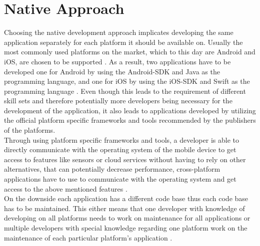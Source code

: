 \documentclass[Bachelor,BIF,english]{twbook}
\begin{document}
\section{Native Approach}
Choosing the native development approach implicates developing the same application separately for each platform it should be available on. Usually the most commonly used platforms on the market, which to this day are Android and iOS, are chosen to be supported \cite[p.~5]{Steczko2016}. As a result, two applications have to be developed one for Android by using the Android-SDK and Java as the programming language, and one for iOS by using the iOS-SDK and Swift as the programming language \cite[p.~5]{LinckArne2016} \cite{AppleGettingStarted}. Even though this leads to the requirement of different skill sets and therefore potentially more developers being necessary for the development of the application, it also leads to applications developed by utilizing the official platform specific frameworks and tools recommended by the publishers of the platforms. 
\\[\baselineskip]
Through using platform specific frameworks and tools, a developer is able to directly communicate with the operating system of the mobile device to get access to features like sensors or cloud services without having to rely on other alternatives, that can potentially decrease performance, cross-platform applications have to use to communicate with the operating system and get access to the above mentioned features \cite[p.~6]{LinckArne2016}.
\\[\baselineskip]
On the downside each application has a different code base thus each code base has to be maintained. This either means that one developer with knowledge of developing on all platforms needs to work on maintenance for all applications or multiple developers with special knowledge regarding one platform work on the maintenance of each particular platform's application \cite[p.~6]{LinckArne2016}.
\end{document}
